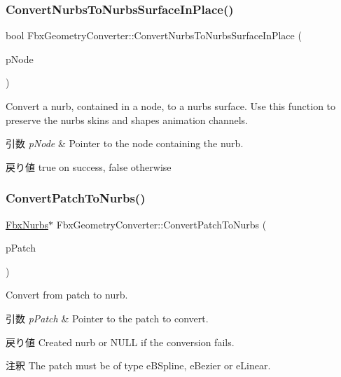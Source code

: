 \subsubsection{\texorpdfstring{Convert\+Nurbs\+To\+Nurbs\+Surface\+In\+Place()}{ConvertNurbsToNurbsSurfaceInPlace()}}
{\footnotesize\ttfamily bool Fbx\+Geometry\+Converter\+::\+Convert\+Nurbs\+To\+Nurbs\+Surface\+In\+Place (\begin{DoxyParamCaption}\item[{\hyperlink{class_fbx_node}{Fbx\+Node} $\ast$}]{p\+Node }\end{DoxyParamCaption})}

Convert a nurb, contained in a node, to a nurbs surface. Use this function to preserve the nurb\textquotesingle{}s skins and shapes animation channels. 
\begin{DoxyParams}{引数}
{\em p\+Node} & Pointer to the node containing the nurb. \\
\hline
\end{DoxyParams}
\begin{DoxyReturn}{戻り値}
{\ttfamily true} on success, {\ttfamily false} otherwise 
\end{DoxyReturn}
\mbox{\label{class_fbx_geometry_converter_a3164d027c0c9251642f8e48f6a59f662}} 
\subsubsection{\texorpdfstring{Convert\+Patch\+To\+Nurbs()}{ConvertPatchToNurbs()}}
{\footnotesize\ttfamily \hyperlink{class_fbx_nurbs}{Fbx\+Nurbs}$\ast$ Fbx\+Geometry\+Converter\+::\+Convert\+Patch\+To\+Nurbs (\begin{DoxyParamCaption}\item[{\hyperlink{class_fbx_patch}{Fbx\+Patch} $\ast$}]{p\+Patch }\end{DoxyParamCaption})}

Convert from patch to nurb. 
\begin{DoxyParams}{引数}
{\em p\+Patch} & Pointer to the patch to convert. \\
\hline
\end{DoxyParams}
\begin{DoxyReturn}{戻り値}
Created nurb or {\ttfamily N\+U\+LL} if the conversion fails. 
\end{DoxyReturn}
\begin{DoxyRemark}{注釈}
The patch must be of type e\+B\+Spline, e\+Bezier or e\+Linear. 
\end{DoxyRemark}
\mbox{\label{class_fbx_geometry_converter_acc457be0a21f7566ff8bdd0d9a704b46}} 
